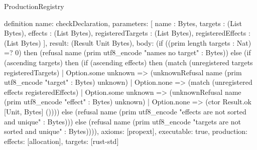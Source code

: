 \begin{lexlean}{ProductionRegistry}
\begin{semanticmodule}
definition{
  name: checkDeclaration,
  parameters: [
    name : Bytes,
    targets : (List Bytes),
    effects : (List Bytes),
    registeredTargets : (List Bytes),
    registeredEffects : (List Bytes)
  ],
  result: (Result Unit Bytes),
  body: (if ((prim length targets : Nat) =? 0) then (refusal name (prim utf8_encode "names no target" : Bytes)) else (if (ascending targets) then (if (ascending effects) then (match (unregistered targets registeredTargets)
    | Option.some unknown => (unknownRefusal name (prim utf8_encode "target" : Bytes) unknown)
    | Option.none => (match (unregistered effects registeredEffects)
      | Option.some unknown => (unknownRefusal name (prim utf8_encode "effect" : Bytes) unknown)
      | Option.none => (ctor Result.ok [Unit, Bytes] ()))) else (refusal name (prim utf8_encode "effects are not sorted and unique" : Bytes))) else (refusal name (prim utf8_encode "targets are not sorted and unique" : Bytes)))),
  axioms: [propext],
  executable: true,
  production: {effects: [allocation], targets: [rust-std]}
}
\end{semanticmodule}
\end{lexlean}
